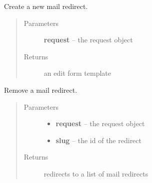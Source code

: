 \documentclass[letterpaper,10pt,english]{sphinxmanual}
\begin{document}
\begin{fulllineitems}
\label{api/mail:limeade.mail.views.redirect_add}
Create a new mail redirect.
\begin{quote}\begin{description}
\item[{Parameters}] \leavevmode
\textbf{request} -- the request object

\item[{Returns}] \leavevmode
an edit form template

\end{description}\end{quote}

\end{fulllineitems}


\begin{fulllineitems}
\label{api/mail:limeade.mail.views.redirect_delete}
Remove a mail redirect.
\begin{quote}\begin{description}
\item[{Parameters}] \leavevmode\begin{itemize}
\item {} 
\textbf{request} -- the request object

\item {} 
\textbf{slug} -- the id of the redirect

\end{itemize}

\item[{Returns}] \leavevmode
redirects to a list of mail redirects

\end{description}\end{quote}

\end{fulllineitems}

\end{document}
